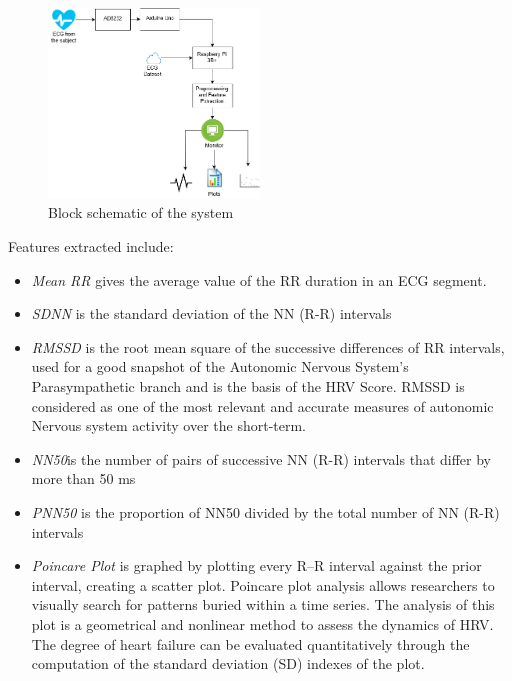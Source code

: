 \documentclass[11pt]{article}
\theoremstyle{definition}
\begin{document}
\begin{figure}[h]
\caption{Block schematic of the system}
\centering
\includegraphics[width=0.5\textwidth]{block_diagram}
\end{figure}



  Features extracted include:
  \begin{itemize}[topsep=1pt]
    \item[] \textit{Mean RR} gives the average value of the RR duration in an ECG segment.
    \item[] \textit{SDNN} is the standard deviation of the NN (R-R) intervals
    \item[] \textit{RMSSD} is the root mean square of the successive differences of RR intervals, used for a good snapshot of the Autonomic Nervous System’s Parasympathetic branch and is the basis of the HRV Score.  RMSSD is considered as one of the most relevant and accurate measures of autonomic Nervous system activity over the short-term.
    \item[] \textit{NN50}is the number of pairs of successive NN (R-R) intervals that differ by more than 50 ms
    \item[] \textit{PNN50} is the proportion of NN50 divided by the total number of NN (R-R) intervals
    \item[] \textit{Poincare Plot} is graphed by plotting every R–R interval against the prior interval, creating a scatter plot.
    Poincare plot analysis allows researchers to visually search for patterns buried within a time series.
    The analysis of this plot is a geometrical and nonlinear method to assess the dynamics of HRV.
    The degree of heart failure can be evaluated quantitatively through the computation of the standard deviation (SD) indexes of the plot\cite{hsu2012poincare}.
  \end{itemize}
\end{document}

